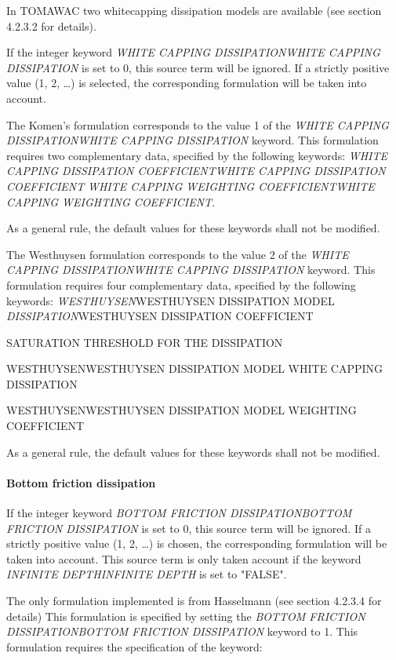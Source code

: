  In TOMAWAC two whitecapping dissipation models are available (see section 4.2.3.2 for details).

 If the integer keyword \textit{WHITE CAPPING DISSIPATIONWHITE CAPPING DISSIPATION }is set to 0, this source term will be ignored. If a strictly positive value (1, 2, \dots ) is selected, the corresponding formulation will be taken into account.

 The Komen's formulation corresponds to the value 1 of the \textit{WHITE CAPPING DISSIPATIONWHITE CAPPING DISSIPATION} keyword. This formulation requires two complementary data, specified by the following keywords:   \textit{WHITE CAPPING DISSIPATION COEFFICIENTWHITE CAPPING DISSIPATION COEFFICIENT}   \textit{WHITE CAPPING WEIGHTING COEFFICIENTWHITE CAPPING WEIGHTING COEFFICIENT}.

 As a general rule, the default values for these keywords shall not be modified.



 The Westhuysen formulation corresponds to the value 2 of the \textit{WHITE CAPPING DISSIPATIONWHITE CAPPING DISSIPATION} keyword. This formulation requires four complementary data, specified by the following keywords:   \textit{WESTHUYSEN}WESTHUYSEN DISSIPATION MODEL\textit{ DISSIPATION}WESTHUYSEN DISSIPATION COEFFICIENT

 SATURATION THRESHOLD FOR THE DISSIPATION

 WESTHUYSENWESTHUYSEN DISSIPATION MODEL WHITE CAPPING DISSIPATION

 WESTHUYSENWESTHUYSEN DISSIPATION MODEL WEIGHTING COEFFICIENT

 As a general rule, the default values for these keywords shall not be modified.




\paragraph{ Bottom friction dissipation}

 If the integer keyword \textit{BOTTOM FRICTION DISSIPATIONBOTTOM FRICTION DISSIPATION} is set to 0, this source term will be ignored. If a strictly positive value (1, 2, \dots ) is chosen, the corresponding formulation will be taken into account. This source term is only taken account if the keyword \textit{INFINITE DEPTHINFINITE DEPTH} is set to "FALSE".

 The only formulation implemented is from Hasselmann (see section 4.2.3.4 for details) This formulation is specified by setting the \textit{BOTTOM FRICTION DISSIPATIONBOTTOM FRICTION DISSIPATION} keyword to 1. This formulation requires the specification of the keyword:

